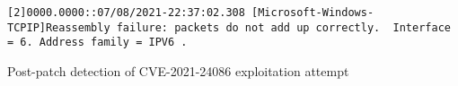 \documentclass{report}
\begin{document}
\begin{listing}[H]
    \begin{verbatim}
[2]0000.0000::07/08/2021-22:37:02.308 [Microsoft-Windows-TCPIP]Reassembly failure: packets do not add up correctly.  Interface = 6. Address family = IPV6 .
\end{verbatim}
\caption{Post-patch detection of CVE-2021-24086 exploitation attempt}
\label{listing:detection:etw:detection-post-patch:result}
\end{listing}
\end{document}
